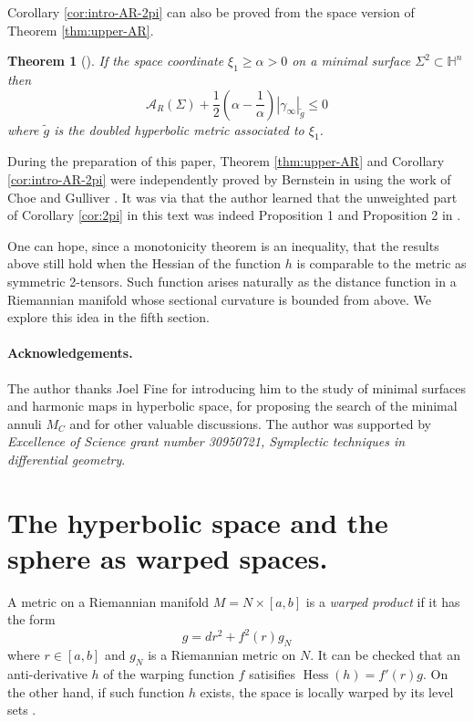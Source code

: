 \documentclass[11pt]{article}
\newtheorem{theorem}{Theorem}
\DeclareMathOperator{\hess}{Hess}
\begin{document}
Corollary \ref{cor:intro-AR-2pi} can also be proved from the space version of
Theorem \ref{thm:upper-AR}.
\begin{theorem}[]
\label{thm:intro-AR-space}
If the space coordinate \(\xi_1 \geq \alpha >0\) on a minimal surface \(\Sigma^2\subset
\mathbb{H}^n\) then
   \[ 
   \mathcal{A}_R(\Sigma) + \frac{1}{2}\left(\alpha - \frac{1}{\alpha}\right)|\gamma_\infty|_{\tilde g} \leq 0  
   \]
where \(\tilde g\) is the doubled hyperbolic metric associated to \(\xi_1\).
\end{theorem}

During the preparation of this paper, Theorem \ref{thm:upper-AR} and Corollary \ref{cor:intro-AR-2pi} were independently proved by Bernstein 
in \cite{Bernstein21_SharpIsoperimetricProperty} using the work of Choe and Gulliver
\cite{Choe.Gulliver92_SharpIsoperimetricInequality}. It was via
\cite{Bernstein21_SharpIsoperimetricProperty} that the author learned that the unweighted
part of Corollary \ref{cor:2pi} in this text was indeed Proposition 1 and Proposition 2 in \cite{Choe.Gulliver92_SharpIsoperimetricInequality}.

One can hope, since a monotonicity theorem is an inequality, that the results above still
 hold when the Hessian of the function \(h\) is comparable to the metric as symmetric
 2-tensors. Such function arises naturally as the distance function in a Riemannian
 manifold whose sectional curvature is bounded from above. We explore this
 idea in the fifth section.

\paragraph{Acknowledgements.}
The author thanks Joel Fine for introducing him to the study of minimal surfaces and
harmonic maps in hyperbolic space, for proposing the search of the minimal annuli \(M_C\) and
for other valuable discussions. The author was supported by 
\emph{Excellence of Science grant number 30950721, Symplectic techniques in differential geometry}.

\section{The hyperbolic space and the sphere as warped spaces.}
\label{sec:org1de8580}
A metric on a Riemannian manifold \(M=N\times [a,b]\) is a \emph{warped product} if it has the
 form 
\begin{equation}
\label{eq:warped-metric}
 g = dr^2 + f^2(r) g_N 
\end{equation}
where \(r\in [a,b]\) and \(g_N\) is a Riemannian metric on \(N\). It can be checked that an anti-derivative \(h\) of the warping function \(f\) satisifies  \(\hess(h) =
f'(r) g\). On the other hand, if such function \(h\) exists, the space is locally
warped by its level sets \cite{Cheeger.Colding96_LowerBoundsRicci}.
\end{document}
